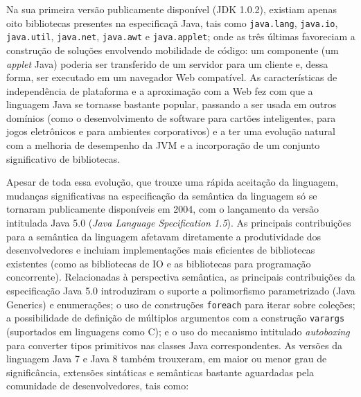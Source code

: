 
Na sua primeira vers\~{a}o publicamente dispon\'{i}vel 
(\acs{JDK} 1.0.2), existiam apenas oito bibliotecas 
presentes na especifica\c c\~{a} Java, tais como 
\texttt{java.lang}, \texttt{java.io}, \texttt{java.util},  
\texttt{java.net}, \texttt{java.awt} e \texttt{java.applet}; 
onde as tr\^{e}s \'{u}ltimas favoreciam a constru\c c\~{a}o de 
solu\c c\~{o}es envolvendo mobilidade de c\'{o}digo:
um componente (um \textit{applet} Java) poderia ser transferido de um 
servidor para um cliente e, dessa forma, 
ser executado em um navegador Web compat\'{i}vel. As caracter\'{i}sticas de 
independ\^{e}ncia de plataforma e a aproxima\c c\~{a}o com a Web fez 
com que a linguagem Java se tornasse bastante popular, passando a ser 
usada em outros dom\'{i}nios (como o desenvolvimento de software 
para cart\~{o}es inteligentes, para jogos eletr\^{o}nicos e para ambientes corporativos) e a ter 
uma evolu\c c\~{a}o natural com a melhoria de desempenho da 
\acs{JVM} e a incorpora\c c\~{a}o de um conjunto significativo de 
bibliotecas. 

Apesar de toda essa evolu\c c\~{a}o, que 
trouxe uma r\'{a}pida aceita\c c\~{a}o da linguagem, 
mudan\c cas significativas na especifica\c c\~{a}o 
da sem\^{a}ntica da linguagem s\'{o} se 
tornaram publicamente dispon\'{i}veis em 2004, 
com o lan\c camento da vers\~{a}o intitulada 
Java 5.0 (\emph{Java Language Specification 1.5}). As principais 
contribui\c c\~{o}es para a sem\^{a}ntica da linguagem afetavam 
diretamente a produtividade dos desenvolvedores e incluiam 
implementa\c c\~{o}es mais eficientes de bibliotecas 
existentes (como as bibliotecas de IO e as bibliotecas 
para programa\c c\~{a}o concorrente). Relacionadas \`{a} 
perspectiva sem\^{a}ntica, as principais contribui\c c\~{o}es 
da especifica\c c\~{a}o Java 5.0 introduziram o suporte 
a polimorfismo parametrizado (Java Generics) e enumera\c c\~{o}es; 
o uso de constru\c c\~{o}es \texttt{foreach} para iterar 
sobre cole\c c\~{o}es; a possibilidade de defini\c c\~{a}o de m\'{u}ltiplos 
argumentos com a constru\c c\~{a}o \texttt{varargs} (suportados em 
linguagens como C); e o uso do mecanismo intitulado 
\emph{autoboxing} para converter tipos primitivos nas 
classes Java correspondentes. 
As vers\~{o}es da linguagem Java 7 e Java 8 tamb\'{e}m trouxeram, 
em maior ou menor grau de signific\^{a}ncia, extens\~{o}es sint\'{a}ticas 
e sem\^{a}nticas bastante aguardadas pela comunidade de 
desenvolvedores, tais como:

